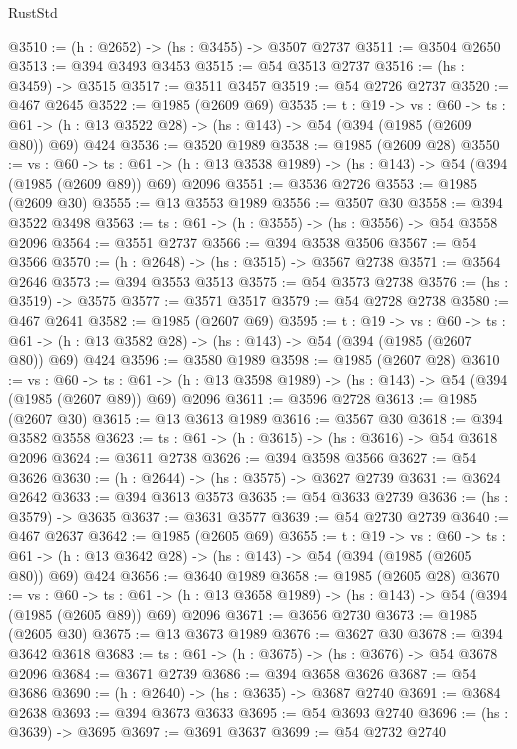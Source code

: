 \begin{lexlean}{RustStd}
\begin{coremodule}
@3510 := (h : @2652) -> (hs : @3455) -> @3507 @2737
@3511 := @3504 @2650
@3513 := @394 @3493 @3453
@3515 := @54 @3513 @2737
@3516 := (hs : @3459) -> @3515
@3517 := @3511 @3457
@3519 := @54 @2726 @2737
@3520 := @467 @2645
@3522 := @1985 (@2609 @69)
@3535 := {t : @19} ->
  {vs : @60} ->
  {ts : @61} -> (h : @13 @3522 @28) -> (hs : @143) -> @54 (@394 (@1985 (@2609 @80)) @69) @424
@3536 := @3520 @1989
@3538 := @1985 (@2609 @28)
@3550 := {vs : @60} ->
  {ts : @61} -> (h : @13 @3538 @1989) -> (hs : @143) -> @54 (@394 (@1985 (@2609 @89)) @69) @2096
@3551 := @3536 @2726
@3553 := @1985 (@2609 @30)
@3555 := @13 @3553 @1989
@3556 := @3507 @30
@3558 := @394 @3522 @3498
@3563 := {ts : @61} -> (h : @3555) -> (hs : @3556) -> @54 @3558 @2096
@3564 := @3551 @2737
@3566 := @394 @3538 @3506
@3567 := @54 @3566
@3570 := (h : @2648) -> (hs : @3515) -> @3567 @2738
@3571 := @3564 @2646
@3573 := @394 @3553 @3513
@3575 := @54 @3573 @2738
@3576 := (hs : @3519) -> @3575
@3577 := @3571 @3517
@3579 := @54 @2728 @2738
@3580 := @467 @2641
@3582 := @1985 (@2607 @69)
@3595 := {t : @19} ->
  {vs : @60} ->
  {ts : @61} -> (h : @13 @3582 @28) -> (hs : @143) -> @54 (@394 (@1985 (@2607 @80)) @69) @424
@3596 := @3580 @1989
@3598 := @1985 (@2607 @28)
@3610 := {vs : @60} ->
  {ts : @61} -> (h : @13 @3598 @1989) -> (hs : @143) -> @54 (@394 (@1985 (@2607 @89)) @69) @2096
@3611 := @3596 @2728
@3613 := @1985 (@2607 @30)
@3615 := @13 @3613 @1989
@3616 := @3567 @30
@3618 := @394 @3582 @3558
@3623 := {ts : @61} -> (h : @3615) -> (hs : @3616) -> @54 @3618 @2096
@3624 := @3611 @2738
@3626 := @394 @3598 @3566
@3627 := @54 @3626
@3630 := (h : @2644) -> (hs : @3575) -> @3627 @2739
@3631 := @3624 @2642
@3633 := @394 @3613 @3573
@3635 := @54 @3633 @2739
@3636 := (hs : @3579) -> @3635
@3637 := @3631 @3577
@3639 := @54 @2730 @2739
@3640 := @467 @2637
@3642 := @1985 (@2605 @69)
@3655 := {t : @19} ->
  {vs : @60} ->
  {ts : @61} -> (h : @13 @3642 @28) -> (hs : @143) -> @54 (@394 (@1985 (@2605 @80)) @69) @424
@3656 := @3640 @1989
@3658 := @1985 (@2605 @28)
@3670 := {vs : @60} ->
  {ts : @61} -> (h : @13 @3658 @1989) -> (hs : @143) -> @54 (@394 (@1985 (@2605 @89)) @69) @2096
@3671 := @3656 @2730
@3673 := @1985 (@2605 @30)
@3675 := @13 @3673 @1989
@3676 := @3627 @30
@3678 := @394 @3642 @3618
@3683 := {ts : @61} -> (h : @3675) -> (hs : @3676) -> @54 @3678 @2096
@3684 := @3671 @2739
@3686 := @394 @3658 @3626
@3687 := @54 @3686
@3690 := (h : @2640) -> (hs : @3635) -> @3687 @2740
@3691 := @3684 @2638
@3693 := @394 @3673 @3633
@3695 := @54 @3693 @2740
@3696 := (hs : @3639) -> @3695
@3697 := @3691 @3637
@3699 := @54 @2732 @2740

\end{coremodule}
\end{lexlean}
